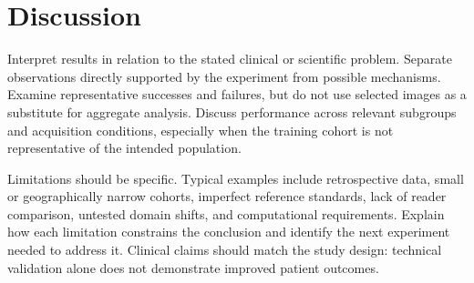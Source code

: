 \section{Discussion}
\label{sec:discussion}

Interpret results in relation to the stated clinical or scientific problem.
Separate observations directly supported by the experiment from possible
mechanisms.  Examine representative successes and failures, but do not use
selected images as a substitute for aggregate analysis.  Discuss performance
across relevant subgroups and acquisition conditions, especially when the
training cohort is not representative of the intended population.

Limitations should be specific.  Typical examples include retrospective data,
small or geographically narrow cohorts, imperfect reference standards, lack of
reader comparison, untested domain shifts, and computational requirements.
Explain how each limitation constrains the conclusion and identify the next
experiment needed to address it.  Clinical claims should match the study
design: technical validation alone does not demonstrate improved patient
outcomes.
